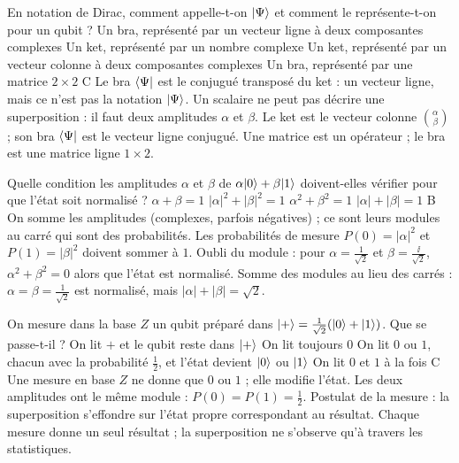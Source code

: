  {En notation de Dirac, comment appelle-t-on $|\Psi\rangle$ et comment le représente-t-on pour un qubit ?}
  {Un bra, représenté par un vecteur ligne à deux composantes complexes}
  {Un ket, représenté par un nombre complexe}
  {Un ket, représenté par un vecteur colonne à deux composantes complexes}
  {Un bra, représenté par une matrice $2\times2$}
  {C}
\qcmx
  {Le bra $\langle \Psi|$ est le conjugué transposé du ket : un vecteur ligne, mais ce n'est pas la notation $|\Psi\rangle$.}
  {Un scalaire ne peut pas décrire une superposition : il faut deux amplitudes $\alpha$ et $\beta$.}
  {Le ket est le vecteur colonne $\binom{\alpha}{\beta}$ ; son bra $\langle \Psi|$ est le vecteur ligne conjugué.}
  {Une matrice est un opérateur ; le bra est une matrice ligne $1\times2$.}

  {Quelle condition les amplitudes $\alpha$ et $\beta$ de $\alpha|0\rangle+\beta|1\rangle$ doivent-elles vérifier pour que l'état soit normalisé ?}
  {$\alpha+\beta=1$}
  {$|\alpha|^2+|\beta|^2=1$}
  {$\alpha^2+\beta^2=1$}
  {$|\alpha|+|\beta|=1$}
  {B}
\qcmx
  {On somme les amplitudes (complexes, parfois négatives) ; ce sont leurs modules au carré qui sont des probabilités.}
  {Les probabilités de mesure $P(0)=|\alpha|^2$ et $P(1)=|\beta|^2$ doivent sommer à $1$.}
  {Oubli du module : pour $\alpha=\frac{1}{\sqrt2}$ et $\beta=\frac{\ii}{\sqrt2}$, $\alpha^2+\beta^2=0$ alors que l'état est normalisé.}
  {Somme des modules au lieu des carrés : $\alpha=\beta=\frac{1}{\sqrt2}$ est normalisé, mais $|\alpha|+|\beta|=\sqrt2$.}

  {On mesure dans la base $Z$ un qubit préparé dans $|+\rangle=\frac{1}{\sqrt2}(|0\rangle+|1\rangle)$. Que se passe-t-il ?}
  {On lit $+$ et le qubit reste dans $|+\rangle$}
  {On lit toujours $0$}
  {On lit $0$ ou $1$, chacun avec la probabilité $\frac12$, et l'état devient $|0\rangle$ ou $|1\rangle$}
  {On lit $0$ et $1$ à la fois}
  {C}
\qcmx
  {Une mesure en base $Z$ ne donne que $0$ ou $1$ ; elle modifie l'état.}
  {Les deux amplitudes ont le même module : $P(0)=P(1)=\frac12$.}
  {Postulat de la mesure : la superposition s'effondre sur l'état propre correspondant au résultat.}
  {Chaque mesure donne un seul résultat ; la superposition ne s'observe qu'à travers les statistiques.}

